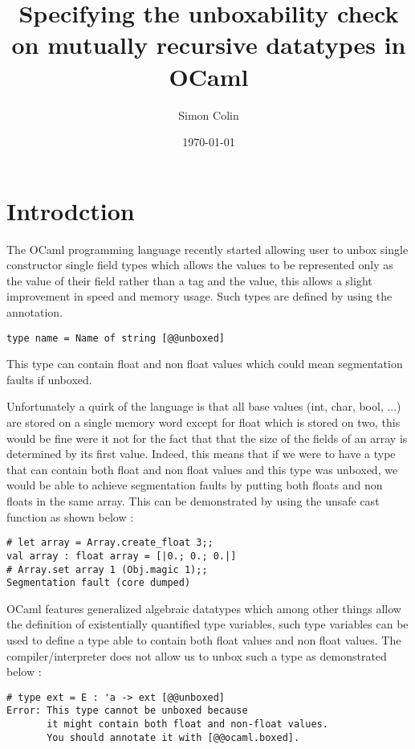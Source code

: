 \documentclass[a4]{article}
\title{Specifying the unboxability check on mutually recursive datatypes in OCaml}
\author{Simon Colin}
\date{\today}
\begin{document}
\maketitle

\section{Introdction}

The OCaml programming language recently started allowing user to unbox single constructor single field types which allows the values to be represented only as the value of their field rather than a tag and the value, this allows a slight improvement in speed and memory usage. Such types are defined by using the \code{[@@unboxed]} annotation.

\begin{lstlisting}
type name = Name of string [@@unboxed]
\end{lstlisting}
{\footnotesize This type can contain float and non float values which could mean segmentation faults if unboxed.}

Unfortunately a quirk of the language is that all base values (int, char, bool, ...) are stored on a single memory word except for float which is stored on two, this would be fine were it not for the fact that that the size of the fields of an array is determined by its first value. Indeed, this means that if we were to have a type that can contain both float and non float values and this type was unboxed, we would be able to achieve segmentation faults by putting both floats and non floats in the same array. This can be demonstrated by using the unsafe cast function  as shown below :

\begin{lstlisting}
# let array = Array.create_float 3;;
val array : float array = [|0.; 0.; 0.|]
# Array.set array 1 (Obj.magic 1);;
Segmentation fault (core dumped)
\end{lstlisting}
OCaml features generalized algebraic datatypes which among other things allow the definition of existentially quantified type variables, such type variables can be used to define a type able to contain both float values and non float values. The compiler/interpreter does not allow us to unbox such a type as demonstrated below :

\begin{lstlisting}
# type ext = E : 'a -> ext [@@unboxed]
Error: This type cannot be unboxed because
       it might contain both float and non-float values.
       You should annotate it with [@@ocaml.boxed].
\end{lstlisting}
\end{document}
